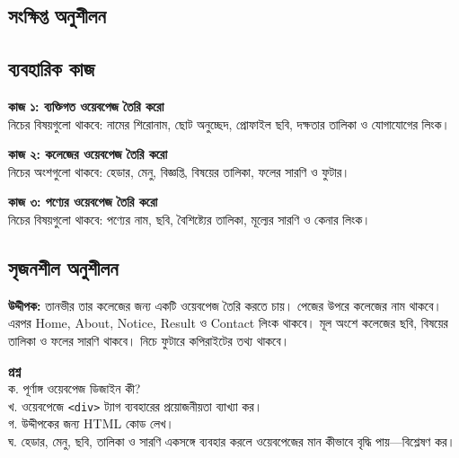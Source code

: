 \subsection{সংক্ষিপ্ত অনুশীলন}

\par\noindent
\begin{minipage}[t]{.48\linewidth}\vspace{0pt}
\end{minipage}\hfill
\begin{minipage}[t]{.48\linewidth}\vspace{0pt}
\end{minipage}\par\smallskip
\noindent
\begin{minipage}[t]{.48\linewidth}\vspace{0pt}
\end{minipage}\par


\subsection{ব্যবহারিক কাজ}

\begin{practicebox}
\textbf{কাজ ১: ব্যক্তিগত ওয়েবপেজ তৈরি করো}\\
নিচের বিষয়গুলো থাকবে: নামের শিরোনাম, ছোট অনুচ্ছেদ, প্রোফাইল ছবি, দক্ষতার তালিকা ও যোগাযোগের লিংক।

\textbf{কাজ ২: কলেজের ওয়েবপেজ তৈরি করো}\\
নিচের অংশগুলো থাকবে: হেডার, মেনু, বিজ্ঞপ্তি, বিষয়ের তালিকা, ফলের সারণি ও ফুটার।

\textbf{কাজ ৩: পণ্যের ওয়েবপেজ তৈরি করো}\\
নিচের বিষয়গুলো থাকবে: পণ্যের নাম, ছবি, বৈশিষ্ট্যের তালিকা, মূল্যের সারণি ও কেনার লিংক।
\end{practicebox}

\subsection{সৃজনশীল অনুশীলন}

\begin{practicebox}
\textbf{উদ্দীপক:} তানভীর তার কলেজের জন্য একটি ওয়েবপেজ তৈরি করতে চায়। পেজের উপরে কলেজের নাম থাকবে। এরপর Home, About, Notice, Result ও Contact লিংক থাকবে। মূল অংশে কলেজের ছবি, বিষয়ের তালিকা ও ফলের সারণি থাকবে। নিচে ফুটারে কপিরাইটের তথ্য থাকবে।

\textbf{প্রশ্ন}\\
ক. পূর্ণাঙ্গ ওয়েবপেজ ডিজাইন কী?\\
খ. ওয়েবপেজে \texttt{<div>} ট্যাগ ব্যবহারের প্রয়োজনীয়তা ব্যাখ্যা কর।\\
গ. উদ্দীপকের জন্য HTML কোড লেখ।\\
ঘ. হেডার, মেনু, ছবি, তালিকা ও সারণি একসঙ্গে ব্যবহার করলে ওয়েবপেজের মান কীভাবে বৃদ্ধি পায়—বিশ্লেষণ কর।
\end{practicebox}

